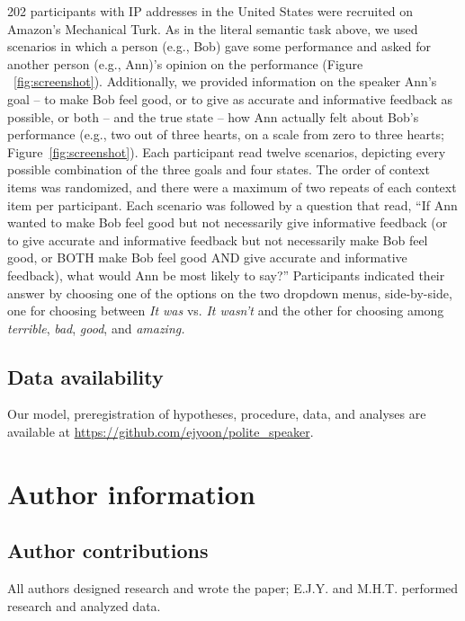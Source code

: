 \documentclass[floatsintext,man]{apa6}
\theoremstyle{definition}
\theoremstyle{definition}
\theoremstyle{definition}
\theoremstyle{remark}
\begin{document}
202 participants with IP addresses in the United States were recruited
on Amazon's Mechanical Turk. As in the literal semantic task above, we
used scenarios in which a person (e.g., Bob) gave some performance and
asked for another person (e.g., Ann)'s opinion on the performance
(Figure ~\ref{fig:screenshot}). Additionally, we provided information on
the speaker Ann's goal -- to make Bob feel good, or to give as accurate
and informative feedback as possible, or both -- and the true state --
how Ann actually felt about Bob's performance (e.g., two out of three
hearts, on a scale from zero to three hearts;
Figure~\ref{fig:screenshot}). Each participant read twelve scenarios,
depicting every possible combination of the three goals and four states.
The order of context items was randomized, and there were a maximum of
two repeats of each context item per participant. Each scenario was
followed by a question that read, \enquote{If Ann wanted to make Bob
feel good but not necessarily give informative feedback (or to give
accurate and informative feedback but not necessarily make Bob feel
good, or BOTH make Bob feel good AND give accurate and informative
feedback), what would Ann be most likely to say?} Participants indicated
their answer by choosing one of the options on the two dropdown menus,
side-by-side, one for choosing between \emph{It was} vs. \emph{It
wasn't} and the other for choosing among \emph{terrible}, \emph{bad},
\emph{good}, and \emph{amazing.}

\subsection{Data availability}\label{data-availability}

Our model, preregistration of hypotheses, procedure, data, and analyses
are available at \url{https://github.com/ejyoon/polite_speaker}.

\section{Author information}\label{author-information}

\subsection{Author contributions}\label{author-contributions}

All authors designed research and wrote the paper; E.J.Y. and M.H.T.
performed research and analyzed data.
\end{document}
